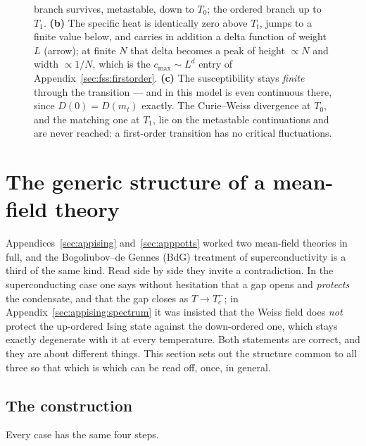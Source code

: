 \documentclass[10pt,a4paper]{article}
\theoremstyle{remark}
\begin{document}
\begin{figure}[htbp]
{branch survives, metastable, down to $T_0$; the ordered branch up to $T_1$.
\textbf{(b)} The specific heat is identically zero above $T_t$, jumps to a finite
value below, and carries in addition a delta function of weight $L$ (arrow); at
finite $N$ that delta becomes a peak of height $\propto N$ and width
$\propto1/N$, which is the $c_{\max}\sim L^{d}$ entry of
Appendix~\ref{sec:fss:firstorder}. \textbf{(c)} The susceptibility stays
\emph{finite} through the transition --- and in this model is even continuous
there, since $D(0)=D(m_t)$ exactly. The Curie--Weiss divergence at $T_0$, and the
matching one at $T_1$, lie on the metastable continuations and are never reached:
a first-order transition has no critical fluctuations.}
\label{fig:apppotts2}
\end{figure}


\section{The generic structure of a mean-field theory}
\label{sec:mfgeneric}

Appendices~\ref{sec:appising} and~\ref{sec:apppotts} worked two mean-field
theories in full, and the Bogoliubov--de Gennes (BdG) treatment of
superconductivity is a third of the same kind. Read side by side they invite a
contradiction. In the superconducting case one says without hesitation that a gap
opens and \emph{protects} the condensate, and that the gap closes as $T\to
T_c^-$; in Appendix~\ref{sec:appising:spectrum} it was insisted that the Weiss
field does \emph{not} protect the up-ordered Ising state against the down-ordered
one, which stays exactly degenerate with it at every temperature. Both statements
are correct, and they are about different things. This section sets out the
structure common to all three so that which is which can be read off, once, in
general.

\subsection{The construction}
\label{sec:mfgeneric:construction}

Every case has the same four steps.
\end{document}
